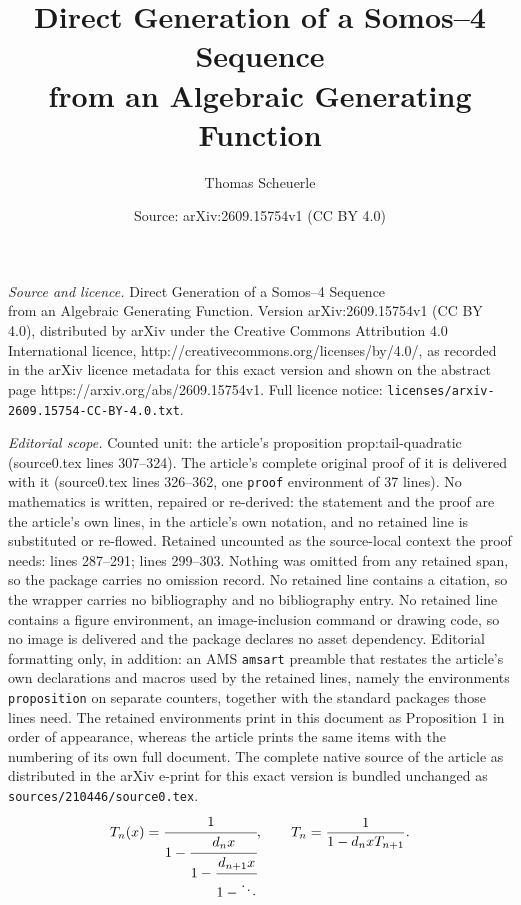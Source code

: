 \documentclass[10pt,a4paper]{amsart}
\title{Direct Generation of a Somos--4 Sequence\\ from an Algebraic Generating Function}
\author{Thomas Scheuerle}
\date{Source: arXiv:2609.15754v1 (CC BY 4.0)}
\begin{document}
\maketitle

\noindent\emph{Source and licence.} Direct Generation of a Somos--4 Sequence\\ from an Algebraic Generating Function. Version arXiv:2609.15754v1 (CC BY 4.0), distributed by arXiv under the Creative Commons Attribution 4.0 International licence, http://creativecommons.org/licenses/by/4.0/, as recorded in the arXiv licence metadata for this exact version and shown on the abstract page https://arxiv.org/abs/2609.15754v1. Full licence notice: \texttt{licenses/arxiv-2609.15754-CC-BY-4.0.txt}.\par\smallskip

\noindent\textit{Editorial scope.} Counted unit: the article's proposition prop:tail-quadratic (source0.tex lines 307--324). The article's complete original proof of it is delivered with it (source0.tex lines 326--362, one \texttt{proof} environment of 37 lines). No mathematics is written, repaired or re-derived: the statement and the proof are the article's own lines, in the article's own notation, and no retained line is substituted or re-flowed.  Retained uncounted as the source-local context the proof needs: lines 287--291; lines 299--303.  Nothing was omitted from any retained span, so the package carries no omission record.  No retained line contains a citation, so the wrapper carries no bibliography and no bibliography entry.  No retained line contains a figure environment, an image-inclusion command or drawing code, so no image is delivered and the package declares no asset dependency.  Editorial formatting only, in addition: an AMS \texttt{amsart} preamble that restates the article's own declarations and macros used by the retained lines, namely the environments \texttt{proposition} on separate counters, together with the standard packages those lines need.  The retained environments print in this document as Proposition 1 in order of appearance, whereas the article prints the same items with the numbering of its own full document.  The complete native source of the article as distributed in the arXiv e-print for this exact version is bundled unchanged as \texttt{sources/210446/source0.tex}.
\begin{equation}
 T_n(x)=\cfrac{1}{1-\cfrac{d_nx}{1-\cfrac{d_{n+1}x}{1-\ddots}}},
 \qquad T_n=\frac{1}{1-d_nxT_{n+1}}.
 \label{eq:tail-fraction}
\end{equation}
\end{document}
